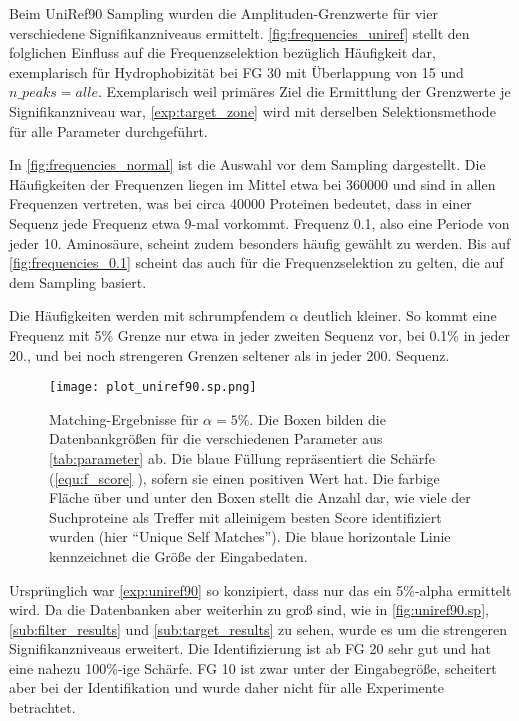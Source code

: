         Beim UniRef90 Sampling wurden die Amplituden-Grenzwerte für vier verschiedene Signifikanzniveaus ermittelt. \autoref{fig:frequencies_uniref} stellt den folglichen Einfluss auf die Frequenzselektion bezüglich Häufigkeit dar, exemplarisch für Hydrophobizität bei \ac{FG} 30 mit Überlappung von 15 und $n\_peaks = alle$. Exemplarisch weil primäres Ziel die Ermittlung der Grenzwerte je Signifikanzniveau war, \autoref{exp:target_zone} wird mit derselben Selektionsmethode für alle Parameter durchgeführt.

        In \autoref{fig:frequencies_normal} ist die Auswahl vor dem Sampling dargestellt. Die Häufigkeiten der Frequenzen liegen im Mittel etwa bei 360000 und sind in allen Frequenzen vertreten, was bei circa 40000 Proteinen bedeutet, dass in einer Sequenz jede Frequenz etwa 9-mal vorkommt. Frequenz 0.1, also eine Periode von jeder 10. Aminosäure, scheint zudem besonders häufig gewählt zu werden. Bis auf \autoref{fig:frequencies_0.1} scheint das auch für die Frequenzselektion zu gelten, die auf dem Sampling basiert.

        Die Häufigkeiten werden mit schrumpfendem $\alpha$ deutlich kleiner. So kommt eine Frequenz mit 5\% Grenze nur etwa in jeder zweiten Sequenz vor, bei 0.1\% in jeder 20., und bei noch strengeren Grenzen seltener als in jeder 200. Sequenz.

        \begin{figure}[H]
            \centering
            \texttt{[image: plot\_uniref90.sp.png]}
            \caption[Single-Protein-Matching ]{Matching-Ergebnisse für $\alpha=5\%$. Die Boxen bilden die Datenbankgrößen für die verschiedenen Parameter aus \autoref{tab:parameter} ab. Die blaue Füllung repräsentiert die Schärfe (\autoref{equ:f_score} ), sofern sie einen positiven Wert hat. Die farbige Fläche über und unter den Boxen stellt die Anzahl dar, wie viele der Suchproteine als Treffer mit alleinigem besten Score identifiziert wurden (hier ``Unique Self Matches''). Die blaue horizontale Linie kennzeichnet die Größe der Eingabedaten.}
            \label{fig:uniref90.sp}
        \end{figure}

        Ursprünglich war \autoref{exp:uniref90} so konzipiert, dass nur das ein 5\%-alpha ermittelt wird. Da die Datenbanken aber weiterhin zu groß sind, wie in \autoref{fig:uniref90.sp}, \autoref{sub:filter_results} und \autoref{sub:target_results} zu sehen, wurde es um die strengeren Signifikanzniveaus erweitert. Die Identifizierung ist ab \ac{FG} 20 sehr gut und hat eine nahezu 100\%-ige Schärfe. \ac{FG} 10 ist zwar unter der Eingabegröße, scheitert aber bei der Identifikation und wurde daher nicht für alle Experimente betrachtet. 
    
